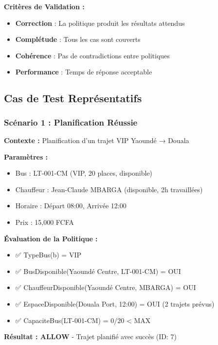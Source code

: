 \documentclass[12pt,a4paper]{article}
\begin{document}
    \textbf{Critères de Validation :}
    \begin{itemize}
        \item \textbf{Correction} : La politique produit les résultats attendus
        \item \textbf{Complétude} : Tous les cas sont couverts
        \item \textbf{Cohérence} : Pas de contradictions entre politiques
        \item \textbf{Performance} : Temps de réponse acceptable
    \end{itemize}

    \subsection{Cas de Test Représentatifs}

    \subsubsection{Scénario 1 : Planification Réussie}

    \begin{resultbox}
        \textbf{Contexte :} Planification d'un trajet VIP Yaoundé → Douala

        \textbf{Paramètres :}
        \begin{itemize}
            \item Bus : LT-001-CM (VIP, 20 places, disponible)
            \item Chauffeur : Jean-Claude MBARGA (disponible, 2h travaillées)
            \item Horaire : Départ 08:00, Arrivée 12:00
            \item Prix : 15,000 FCFA
        \end{itemize}

        \textbf{Évaluation de la Politique :}
        \begin{itemize}
            \item ✅ TypeBus(b) = VIP
            \item ✅ BusDisponible(Yaoundé Centre, LT-001-CM) = OUI
            \item ✅ ChauffeurDisponible(Yaoundé Centre, MBARGA) = OUI
            \item ✅ EspaceDisponible(Douala Port, 12:00) = OUI (2 trajets prévus)
            \item ✅ CapaciteBus(LT-001-CM) = 0/20 < MAX
        \end{itemize}

        \textbf{Résultat : ALLOW} - Trajet planifié avec succès (ID: 7)
    \end{resultbox}
\end{document}
